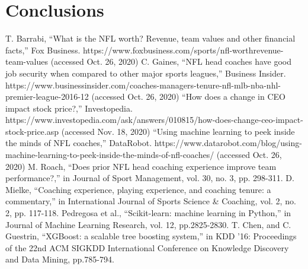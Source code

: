 \documentclass[conference]{IEEEtran}
\begin{document}
\section{Conclusions}

\begin{thebibliography}{00}
 T. Barrabi, ``What is the NFL worth? Revenue, team values and other financial facts,'' Fox Business. https://www.foxbusiness.com/sports/nfl-worthrevenue-team-values (accessed Oct. 26, 2020)
 C. Gaines, ``NFL head coaches have good job security when compared to other major sports leagues,'' Business Insider. https://www.businessinsider.com/coaches-managers-tenure-nfl-mlb-nba-nhl-premier-league-2016-12 (accessed Oct. 26, 2020)
 ``How does a change in CEO impact stock price?,'' Investopedia. https://www.investopedia.com/ask/answers/010815/how-does-change-ceo-impact-stock-price.asp (accessed Nov. 18, 2020)
 ``Using machine learning to peek inside the minds of NFL coaches,'' DataRobot. https://www.datarobot.com/blog/using-machine-learning-to-peek-inside-the-minds-of-nfl-coaches/ (accessed Oct. 26, 2020)
 M. Roach, ``Does prior NFL head coaching experience improve team performance?,'' in Journal of Sport Management, vol. 30, no. 3, pp. 298-311.
 D. Mielke, ``Coaching experience, playing experience, and coaching tenure: a commentary,'' in International Journal of Sports Science \& Coaching, vol. 2, no. 2, pp. 117-118.
 Pedregosa et al., ``Scikit-learn: machine learning in Python,'' in Journal of Machine Learning Research, vol. 12, pp.2825-2830.
 T. Chen, and C. Guestrin, ``XGBoost: a scalable tree boosting system,'' in KDD '16: Proceedings of the 22nd ACM SIGKDD International Conference on Knowledge Discovery and Data Mining, pp.785-794.
\end{thebibliography}
\end{document}
